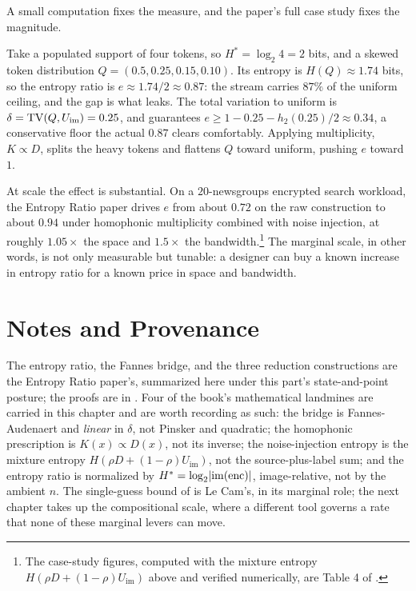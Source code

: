 A small computation fixes the measure, and the paper's full case study fixes
the magnitude.

\begin{example}
\label{ex:entropy-ratio}
Take a populated support of four tokens, so $H^{*} = \log_2 4 = 2$ bits, and
a skewed token distribution $Q = (0.5, 0.25, 0.15, 0.10)$. Its entropy is
$H(Q) \approx 1.74$ bits, so the entropy ratio is $e \approx 1.74/2 \approx
0.87$: the stream carries $87\%$ of the uniform ceiling, and the gap is what
leaks. The total variation to uniform is $\delta = \operatorname{TV}(Q, U_{\mathrm{im}}) =
0.25$, and  guarantees $e \ge 1 - 0.25 - h_2(0.25)/2
\approx 0.34$, a conservative floor the actual $0.87$ clears comfortably.
Applying multiplicity, $K \propto D$, splits the heavy tokens and flattens
$Q$ toward uniform, pushing $e$ toward $1$.
\end{example}

At scale the effect is substantial. On a $20$-newsgroups encrypted search
workload, the Entropy Ratio paper drives $e$ from about $0.72$ on the raw
construction to about $0.94$ under homophonic multiplicity combined with
noise injection, at roughly $1.05\times$ the space and $1.5\times$ the
bandwidth.\footnote{The case-study figures, computed with the mixture entropy
$H(\rho D + (1-\rho)U_{\mathrm{im}})$ above and verified numerically, are
Table 4 of \cite{towell2026maxconf}.} The marginal scale, in other words, is
not only measurable but tunable: a designer can buy a known increase in
entropy ratio for a known price in space and bandwidth.

\section{Notes and Provenance}
\label{sec:ch9-notes}

The entropy ratio, the Fannes bridge, and the three reduction constructions
are the Entropy Ratio paper's, summarized here under this part's
state-and-point posture; the proofs are in \cite{towell2026maxconf}. Four of
the book's mathematical landmines are carried in this chapter and are worth
recording as such: the bridge is Fannes-Audenaert and \emph{linear} in
$\delta$, not Pinsker and quadratic; the homophonic prescription is
$K(x)\propto D(x)$, not its inverse; the noise-injection entropy is the
mixture entropy $H(\rho D + (1-\rho)U_{\mathrm{im}})$, not the source-plus-label
sum; and the entropy ratio is normalized by $H^{*} =
\log_2\lvert\mathrm{im}(\operatorname{enc})\rvert$, image-relative, not by the ambient $n$.
The single-guess bound of  is Le Cam's, in its
marginal role; the next chapter takes up the compositional scale, where a
different tool governs a rate that none of these marginal levers can move.
